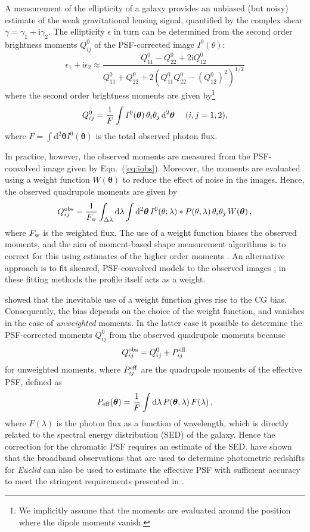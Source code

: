 \documentclass[useAMS,usenatbib]{mnras}
\renewcommand{\d}{\mathrm{d}}
\newcommand{\ii}{\mathrm{i}}
\newcommand{\be}{\begin{equation}}
\newcommand{\ee}{\end{equation}}
\def\elabel#1{\label{eq:#1}}
\begin{document}
A measurement of the ellipticity of a galaxy provides an unbiased (but noisy) estimate of the 
weak gravitational lensing signal, quantified by the complex shear $\gamma=\gamma_1+\ii\gamma_2$.
The ellipticity $\epsilon$ in turn can be determined from the second order brightness moments $Q^0_{ij}$ of the PSF-corrected image $I^0(\theta)$:
%
\be
\epsilon_1+\ii \epsilon_2 \approx \frac{Q^0_{11} - Q^0_{22} + 2 \ii Q^0_{12} }
{Q^0_{11} + Q^0_{22} +2(Q^0_{11}Q^0_{22} - (Q^0_{12})^2)^{1/2}}
\elabel{mshear}
\ee
%
where the second order brightness moments are given by\footnote{We implicitly assume that the moments are evaluated around the position where the dipole moments vanish.}
%
\be
Q^0_{ij} = {1 \over F} \int  I^{0}({\bm \theta})\, \theta_i \theta_j \, \d^2 {\bm \theta} \quad\; (i,j=1,2),
\ee
%
where $F=\int \d^2{{\bm\theta}}  I^{0}({\bm\theta})$ is the total observed photon flux.

In practice, however, the observed moments are measured from the PSF-convolved image given by
Eqn.~(\ref{eq:iobs}). Moreover, the moments are evaluated using a weight function $W({\bm\theta})$  to reduce the effect of noise in the images. Hence, the observed quadrupole moments are given by
\be
Q^{\rm obs}_{ij} = {1 \over F_{\rm w}} \int_{\Delta\lambda} \d\lambda \int \d^2 {\bm\theta} \,
I^0(\theta; \lambda) *  P(\theta,\lambda)\, \theta_i \theta_j \, W({\bm \theta})\,,
\ee
%
where $F_{\rm w}$ is the weighted flux. The use of a weight function biases the observed moments, 
and the aim of moment-based shape measurement algorithms is to correct for this using estimates of the higher order moments \citep[e.g.][]{Kaiser1995,Melchior11}. An alternative approach is to fit sheared, PSF-convolved models to the observed images 
\citep[e.g.][]{Bridle02,Miller13}; in these fitting methods the profile itself acts as a weight. 

 showed that the inevitable use of a weight function gives rise to the CG bias.
Consequently, the bias depends on the choice of the weight function, and vanishes in the case of {\it unweighted} moments. In the latter case it possible to determine the PSF-corrected moments $Q^0_{ij}$ from the observed quadrupole moments because
%
\be
Q^{\rm obs}_{ij}=Q^0_{ij}+P^{\rm eff}_{ij} \,\label{eq:unweighted}
\ee
%
for unweighted moments, where $P^{\rm eff}_{ij}$ are the quadrupole moments of the effective PSF,  defined as
\be
P_{\rm eff}({\bm \theta}) = \frac{1}{F} \int \d \lambda\, P({\bm \theta},\lambda)\, F(\lambda) \,,
\ee
where   $F(\lambda)$ is the photon flux as a function of wavelength, which is directly related to the spectral energy distribution (SED) of the galaxy. Hence the correction for the chromatic PSF requires an estimate of the SED.  \cite{Eriksen17} have shown that the broadband observations that are used to determine photometric redshifts for {\it Euclid} can also be used to estimate the effective PSF with sufficient accuracy to meet the stringent requirements presented in \cite{Cropper13}.
\end{document}
